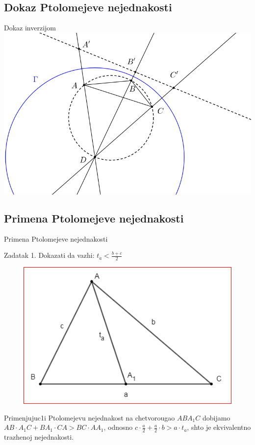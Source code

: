 \documentclass{beamer}
\newcommand{\D}{\displaystyle}
\begin{document}
\subsection{Dokaz Ptolomejeve nejednakosti}
\begin{frame}{Dokaz inverzijom}
    \centering   \includegraphics[scale=0.3]{Ptolomej.png}
\end{frame}

\subsection{Primena Ptolomejeve nejednakosti}
\begin{frame}{Primena Ptolomejeve nejednakosti}
    
\begin{block}{Zadatak 1.}
Dokazati da vazhi: $\D t_a<\frac{b+c}{2}$
\end{block}
\par
\begin{figure} %
    \centering
    \includegraphics[scale=0.4]{Slika8}
\end{figure}
Primenjujuc1i Ptolomejevu nejednakost na chetvorougao $ABA_1C$ dobijamo
$AB\cdot A_1C+BA_1\cdot CA>BC\cdot AA_1$, odnosno $\D c\cdot\frac{a}{2}+\frac{a}{2}\cdot b>a\cdot t_a$, shto je ekvivalentno trazhenoj nejednakosti.

\end{frame}
\end{document}
